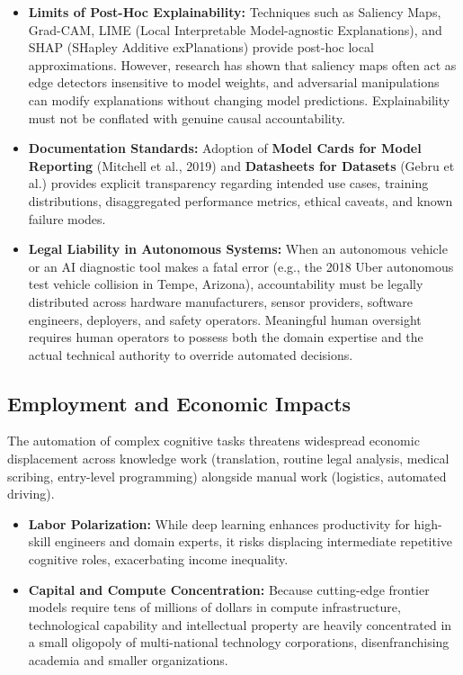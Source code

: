 \documentclass[12pt,a4paper]{article}
\begin{document}
\begin{itemize}[leftmargin=*]
    \item \textbf{Limits of Post-Hoc Explainability:} Techniques such as Saliency Maps, Grad-CAM, LIME (Local Interpretable Model-agnostic Explanations), and SHAP (SHapley Additive exPlanations) provide post-hoc local approximations. However, research has shown that saliency maps often act as edge detectors insensitive to model weights, and adversarial manipulations can modify explanations without changing model predictions. Explainability must not be conflated with genuine causal accountability.
    \item \textbf{Documentation Standards:} Adoption of \textbf{Model Cards for Model Reporting} (Mitchell et al., 2019) and \textbf{Datasheets for Datasets} (Gebru et al.) provides explicit transparency regarding intended use cases, training distributions, disaggregated performance metrics, ethical caveats, and known failure modes.
    \item \textbf{Legal Liability in Autonomous Systems:} When an autonomous vehicle or an AI diagnostic tool makes a fatal error (e.g., the 2018 Uber autonomous test vehicle collision in Tempe, Arizona), accountability must be legally distributed across hardware manufacturers, sensor providers, software engineers, deployers, and safety operators. Meaningful human oversight requires human operators to possess both the domain expertise and the actual technical authority to override automated decisions.
\end{itemize}

\subsection{Employment and Economic Impacts}
The automation of complex cognitive tasks threatens widespread economic displacement across knowledge work (translation, routine legal analysis, medical scribing, entry-level programming) alongside manual work (logistics, automated driving).
\begin{itemize}[leftmargin=*]
    \item \textbf{Labor Polarization:} While deep learning enhances productivity for high-skill engineers and domain experts, it risks displacing intermediate repetitive cognitive roles, exacerbating income inequality.
    \item \textbf{Capital and Compute Concentration:} Because cutting-edge frontier models require tens of millions of dollars in compute infrastructure, technological capability and intellectual property are heavily concentrated in a small oligopoly of multi-national technology corporations, disenfranchising academia and smaller organizations.
\end{itemize}
\end{document}
